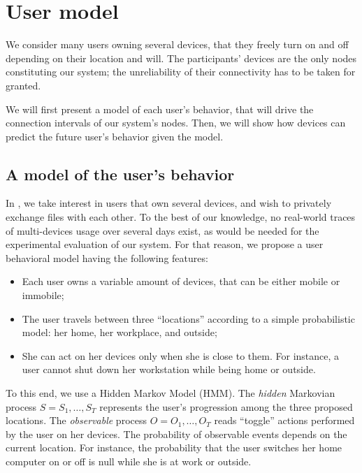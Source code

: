 \section{User model} 
\label{sec:user_model}

We consider many users owning several devices, that they freely turn on and off depending on their location and will.
The participants' devices are the only nodes constituting our system; the unreliability of their connectivity has to be taken for granted.

We will first present a model of each user's behavior, that will drive the connection intervals of our system's nodes.
Then, we will show how devices can predict the future user's behavior given the model.

\subsection{A model of the user's behavior}
\label{sub:a_model_of_the_user_s_behavior}

In \name, we take interest in users that own several devices, and wish to privately exchange files with each other.
To the best of our knowledge, no real-world traces of multi-devices usage over several days exist, as would be needed for the experimental evaluation of our system.
For that reason, we propose a user behavioral model having the following features:

\begin{itemize}
	\item Each user owns a variable amount of devices, that can be either mobile or immobile;
	\item The user travels between three ``locations'' according to a simple probabilistic model: her home, her workplace, and outside;
	\item She can act on her devices only when she is close to them. For instance, a user cannot shut down her workstation while being home or outside.
\end{itemize}

To this end, we use a Hidden Markov Model (HMM). 
The \emph{hidden} Markovian process $S=S_1,\dots,S_T$ represents the user's progression among the three proposed locations.
The \emph{observable} process $O=O_1,\dots,O_T$ reads ``toggle'' actions performed by the user on her devices. The probability of observable events depends on the current location.
For instance, the probability that the user switches her home computer on or off is null while she is at work or outside.

